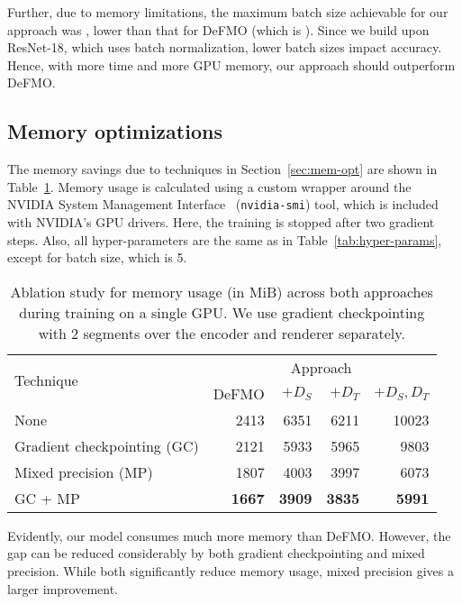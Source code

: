     Further, due to memory limitations, the maximum batch size achievable for our approach was \oursbatchsize, lower than that for DeFMO (which is ).
    Since we build upon ResNet-18, which uses batch normalization, lower batch sizes impact accuracy.
    Hence, with more time and more GPU memory, our approach should outperform DeFMO.\@

\subsection{Memory optimizations}
    The memory savings due to techniques in Section~\ref{sec:mem-opt} are shown in Table~\ref{tab:mem-opt}.
    Memory usage is calculated using a custom wrapper around the NVIDIA System Management Interface~\citep{nvidia-smi} (\texttt{nvidia-smi}) tool, which is included with NVIDIA's GPU drivers.
    Here, the training is stopped after two gradient steps.
    Also, all hyper-parameters are the same as in Table~\ref{tab:hyper-params}, except for batch size, which is 5.

    \begin{table}
        \caption{
            Ablation study for memory usage (in MiB) across both approaches during training on a single GPU.\@
            We use gradient checkpointing with 2 segments over the encoder and renderer separately.
        }%
        \label{tab:mem-opt}
        \begin{tabular}{lrrrr}
            \toprule
            \multirow{2}[2]{*}{Technique} & \multicolumn{4}{c}{Approach}\\
            \cmidrule(lr){2-5}
            & DeFMO & $+ D_S$ & $+ D_T$ & $+ D_S, D_T$\\
            \midrule
            None & 2413 & 6351 & 6211 & 10023\\
            Gradient checkpointing (GC) & 2121 & 5933 & 5965 & 9803\\
            Mixed precision (MP) & 1807 & 4003 & 3997 & 6073\\
            GC + MP & \textbf{1667} & \textbf{3909} & \textbf{3835} & \textbf{5991}\\
            \bottomrule
        \end{tabular}
        \centering
    \end{table}

    Evidently, our model consumes much more memory than DeFMO.\@
    However, the gap can be reduced considerably by both gradient checkpointing and mixed precision.
    While both significantly reduce memory usage, mixed precision gives a larger improvement.


